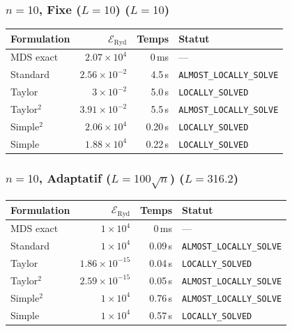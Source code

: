 \subsubsection{$n=10$, Fixe ($L{=}10$) ($L=10$)}
\begin{longtable}{@{}lrrl@{}}
  \toprule
  Formulation & $\mathcal{E}_{\mathrm{Ryd}}$ & Temps & Statut \\
  \midrule
  \endhead
  MDS exact & $2.07\times10^{4}$ & 0\,ms & --- \\
  Standard & $2.56\times10^{-2}$ & 4.5\,s & \texttt{ALMOST\_LOCALLY\_SOLVE} \\
  Taylor & $3\times10^{-2}$ & 5.0\,s & \texttt{LOCALLY\_SOLVED} \\
  Taylor$^2$ & $3.91\times10^{-2}$ & 5.5\,s & \texttt{ALMOST\_LOCALLY\_SOLVE} \\
  Simple$^2$ & $2.06\times10^{4}$ & 0.20\,s & \texttt{LOCALLY\_SOLVED} \\
  Simple & $1.88\times10^{4}$ & 0.22\,s & \texttt{LOCALLY\_SOLVED} \\
  \bottomrule
\end{longtable}

\subsubsection{$n=10$, Adaptatif ($L{=}100\sqrt{n}$) ($L=316.2$)}
\begin{longtable}{@{}lrrl@{}}
  \toprule
  Formulation & $\mathcal{E}_{\mathrm{Ryd}}$ & Temps & Statut \\
  \midrule
  \endhead
  MDS exact & $1\times10^{4}$ & 0\,ms & --- \\
  Standard & $1\times10^{4}$ & 0.09\,s & \texttt{ALMOST\_LOCALLY\_SOLVE} \\
  Taylor & $1.86\times10^{-15}$ & 0.04\,s & \texttt{LOCALLY\_SOLVED} \\
  Taylor$^2$ & $2.59\times10^{-15}$ & 0.05\,s & \texttt{ALMOST\_LOCALLY\_SOLVE} \\
  Simple$^2$ & $1\times10^{4}$ & 0.76\,s & \texttt{ALMOST\_LOCALLY\_SOLVE} \\
  Simple & $1\times10^{4}$ & 0.57\,s & \texttt{LOCALLY\_SOLVED} \\
  \bottomrule
\end{longtable}

